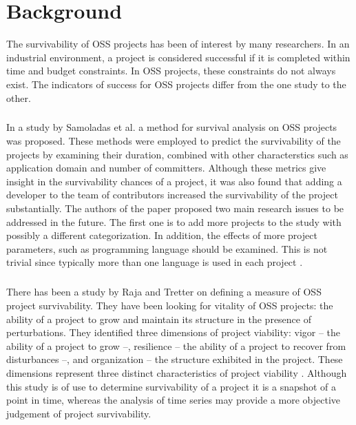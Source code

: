 \chapter{Background}
\label{background}

The survivability of OSS projects has been of interest by many researchers. In
an industrial environment, a project is considered successful if it is completed
within time and budget constraints. In OSS projects, these constraints do not
always exist. The indicators of success for OSS projects differ from the one
study to the other.

\paragraph{}
In a study by Samoladas et al. a method for survival analysis on OSS projects
was proposed. These methods were employed to predict the
survivability of the projects by examining their duration, combined with other
characterstics such as application domain and number of committers. Although
these metrics give insight in the survivability chances of a project, it was
also found that adding a developer to the team of contributors increased the
survivability of the project substantially. The authors of the paper proposed
two main research issues to be addressed in the future. The first one is to add
more projects to the study with possibly a different categorization. In
addition, the effects of more project parameters, such as programming language
should be examined. This is not trivial since typically more than one language
is used in each project \cite{samoladas2010}.

\paragraph{}
There has been a study by Raja and Tretter on defining a measure of OSS project
survivability. They have been looking for vitality of OSS projects: the ability
of a project to grow and maintain its structure in the presence of
perturbations. They identified three dimensions of project viability: vigor --
the ability of a project to grow --, resilience -- the ability of a project to
recover from disturbances --, and organization -- the structure exhibited in the
project. These dimensions represent three distinct characteristics of project
viability \cite{raja2012}. Although this study is of use to determine
survivability of a project it is a snapshot of a point in time, whereas the
analysis of time series may provide a more objective judgement of project
survivability.

